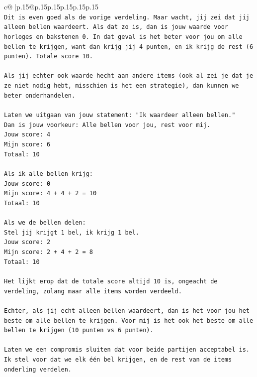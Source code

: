 \documentclass{article}
\begin{document}
{\begin{supertabular}{c@{$\;$}|p{.15\linewidth}@{}p{.15\linewidth}p{.15\linewidth}p{.15\linewidth}p{.15\linewidth}p{.15\linewidth}}
{{{\\ 
\texttt{Dit is even goed als de vorige verdeling. Maar wacht, jij zei dat jij alleen bellen waardeert. Als dat zo is, dan is jouw waarde voor horloges en bakstenen 0. In dat geval is het beter voor jou om alle bellen te krijgen, want dan krijg jij 4 punten, en ik krijg de rest (6 punten). Totale score 10.} \\
\\ 
\texttt{Als jij echter ook waarde hecht aan andere items (ook al zei je dat je ze niet nodig hebt, misschien is het een strategie), dan kunnen we beter onderhandelen.} \\
\\ 
\texttt{Laten we uitgaan van jouw statement: "Ik waardeer alleen bellen."} \\
\texttt{Dan is jouw voorkeur: Alle bellen voor jou, rest voor mij.} \\
\texttt{Jouw score: 4} \\
\texttt{Mijn score: 6} \\
\texttt{Totaal: 10} \\
\\ 
\texttt{Als ik alle bellen krijg:} \\
\texttt{Jouw score: 0} \\
\texttt{Mijn score: 4 + 4 + 2 = 10} \\
\texttt{Totaal: 10} \\
\\ 
\texttt{Als we de bellen delen:} \\
\texttt{Stel jij krijgt 1 bel, ik krijg 1 bel.} \\
\texttt{Jouw score: 2} \\
\texttt{Mijn score: 2 + 4 + 2 = 8} \\
\texttt{Totaal: 10} \\
\\ 
\texttt{Het lijkt erop dat de totale score altijd 10 is, ongeacht de verdeling, zolang maar alle items worden verdeeld.} \\
\\ 
\texttt{Echter, als jij echt alleen bellen waardeert, dan is het voor jou het beste om alle bellen te krijgen. Voor mij is het ook het beste om alle bellen te krijgen (10 punten vs 6 punten).} \\
\\ 
\texttt{Laten we een compromis sluiten dat voor beide partijen acceptabel is. Ik stel voor dat we elk één bel krijgen, en de rest van de items onderling verdelen.} \\
}}}
\end{supertabular}}
\end{document}
